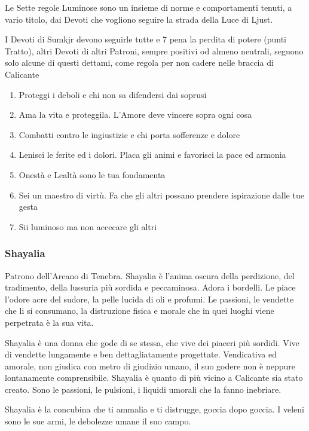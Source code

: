 \documentclass[a4paper,11pt,twoside,openany]{book}
\begin{document}
{Le Sette regole Luminose sono un insieme di norme e comportamenti tenuti, a vario titolo, dai Devoti che vogliono seguire la strada della Luce di Ljust.

I Devoti di Sumkjr devono seguirle tutte e 7 pena la perdita di potere (punti Tratto), altri Devoti di altri Patroni, sempre positivi od almeno neutrali, seguono solo alcune di questi dettami, come regola per non cadere nelle braccia di Calicante


\begin{enumerate}
	\item Proteggi i deboli e chi non sa difendersi dai soprusi
	\item Ama la vita e proteggila. L'Amore deve vincere sopra ogni cosa
	\item Combatti contro le ingiustizie e chi porta sofferenze e dolore
	\item Lenisci le ferite ed i dolori. Placa gli animi e favorisci la pace
	ed armonia
	\item Onestà e Lealtà sono le tua fondamenta
	\item Sei un maestro di virtù. Fa che gli altri possano prendere ispirazione
	dalle tue gesta
	\item Sii luminoso ma non accecare gli altri
\end{enumerate}

\subsubsection{Shayalia}

\label{shayalia}

Patrono dell'Arcano di Tenebra. Shayalia è l'anima oscura della perdizione, del tradimento, della lussuria più sordida e peccaminosa. Adora i bordelli. Le piace l'odore acre del sudore, la pelle lucida di oli e profumi. Le passioni, le vendette che li si consumano, la distruzione fisica e morale che in quei luoghi viene perpetrata è la sua vita.

Shayalia è una donna che gode di se stessa, che vive dei piaceri più sordidi. Vive di vendette lungamente e ben dettagliatamente progettate. Vendicativa ed amorale, non giudica con metro di giudizio umano, il suo godere non è neppure lontanamente comprensibile. Shayalia è quanto di più vicino a Calicante sia stato creato. Sono le passioni, le pulsioni, i liquidi umorali che la fanno inebriare.

Shayalia è la concubina che ti ammalia e ti distrugge, goccia dopo goccia. I veleni sono le sue armi, le debolezze umane il suo campo.

}
\end{document}
